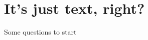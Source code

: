 \documentclass[0-index.tex]{subfiles}
\begin{document}
\section{It's just text, right?}

\begin{frame}{Some questions to start}
\end{frame}
\end{document}
